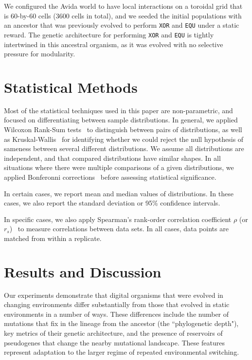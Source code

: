 \documentclass[10pt,letterpaper]{article}
\begin{document}
We configured the Avida world to have local interactions on a toroidal grid that is 60-by-60 cells (3600 cells in total), and we seeded the initial populations with an ancestor that was previously evolved to perform \texttt{XOR} and \texttt{EQU} under a static reward. The genetic architecture for performing \texttt{XOR} and \texttt{EQU} is tightly intertwined in this ancestral organism, as it was evolved with no selective pressure for modularity.

\section{Statistical Methods}
Most of the statistical techniques used in this paper are non-parametric, and focused on differentiating between sample distributions. In general, we applied Wilcoxon Rank-Sum tests~\cite{wilcoxon_individual_1945} to distinguish between pairs of distributions, as well as Kruskal-Wallis~\cite{kruskal_use_1952} for identifying whether we could reject the null hypothesis of sameness between several different distributions. We assume all distributions are independent, and that compared distributions have similar shapes. In all situations where there were multiple comparisons of a given distributions, we applied Bonferonni corrections~\cite{rice_analyzing_1989} before assessing statistical significance. 

In certain cases, we report mean and median values of distributions. In these cases, we also report the standard deviation or 95\% confidence intervals.

In specific cases, we also apply Spearman's rank-order correlation coefficient $\rho$ (or $r_{s}$)~\cite{spearman_proof_1904} to measure correlations between data sets. In all cases, data points are matched from within a replicate.

\section*{Results and Discussion}
Our experiments demonstrate that digital organisms that were evolved in changing environments differ substantially from those that evolved in static environments in a number of ways. These differences include the number of mutations that fix in the lineage from the ancestor (the ``phylogenetic depth"), key metrics of their genetic architecture, and the presence of reservoirs of pseudogenes that change the nearby mutational landscape. These features represent adaptation to the larger regime of repeated environmental switching. 
\end{document}
